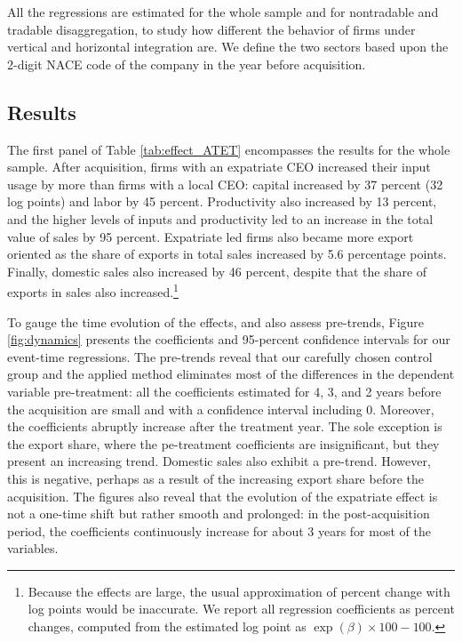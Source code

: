 \documentclass[12pt,a4paper]{article}
\begin{document}
All the regressions are estimated for the whole sample and for nontradable and tradable disaggregation, to study how different the behavior of firms under vertical and horizontal integration are. We define the two sectors based upon the 2-digit NACE code of the company in the year before acquisition.

\subsection{Results} \label{sec:res}

The first panel of Table \ref{tab:effect_ATET} encompasses the results for the whole sample. After acquisition, firms with an expatriate CEO increased their input usage by more than firms with a local CEO: capital increased by 37 percent (32 log points) and labor by 45 percent. Productivity also increased by 13 percent, and the higher levels of inputs and productivity led to an increase in the total value of sales by 95 percent. Expatriate led firms also became more export oriented as the share of exports in total sales increased by 5.6 percentage points. Finally, domestic sales also increased by 46 percent, despite that the share of exports in sales also increased.\footnote{Because the effects are large, the usual approximation of percent change with log points would be inaccurate. We report all regression coefficients as percent changes, computed from the estimated log point as $\exp(\beta)\times100-100$.}

To gauge the time evolution of the effects, and also assess pre-trends, Figure \ref{fig:dynamics} presents the coefficients and 95-percent confidence intervals for our event-time regressions. The pre-trends reveal that our carefully chosen control group and the applied method eliminates most of the differences in the dependent variable pre-treatment: all the coefficients estimated for 4, 3, and 2 years before the acquisition are small and with a confidence interval including 0. Moreover, the coefficients abruptly increase after the treatment year. The sole exception is the export share, where the pe-treatment coefficients are insignificant, but they present an increasing trend. Domestic sales also exhibit a pre-trend. However, this is negative, perhaps as a result of the increasing export share before the acquisition. The figures also reveal that the evolution of the expatriate effect is not a one-time shift but rather smooth and prolonged: in the post-acquisition period, the coefficients continuously increase for about 3 years for most of the variables.
\end{document}
